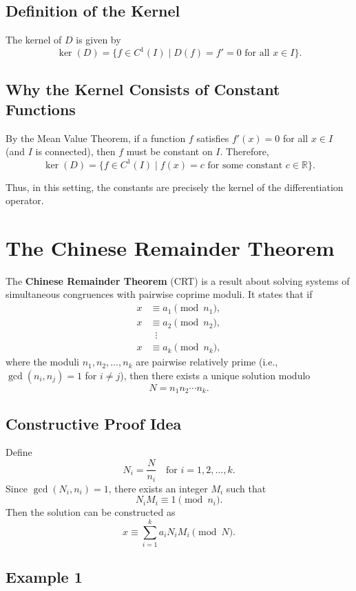 \documentclass[12pt]{article}
\theoremstyle{definition} %
\theoremstyle{plain} %
\begin{document}
\subsection*{Definition of the Kernel}
The kernel of \(D\) is given by
\[
\ker(D) = \{ f \in C^1(I) \mid D(f) = f' = 0 \text{ for all } x \in I \}.
\]

\subsection*{Why the Kernel Consists of Constant Functions}
By the Mean Value Theorem, if a function \(f\) satisfies \(f'(x) = 0\) for all \(x \in I\) (and \(I\) is connected), then \(f\) must be constant on \(I\). Therefore,
\[
\ker(D) = \{ f \in C^1(I) \mid f(x) = c \text{ for some constant } c \in \mathbb{R} \}.
\]

Thus, in this setting, the constants are precisely the kernel of the differentiation operator.

\section*{The Chinese Remainder Theorem}

The \textbf{Chinese Remainder Theorem} (CRT) is a result about solving systems of simultaneous congruences with pairwise coprime moduli. It states that if
\[
\begin{aligned}
x &\equiv a_1 \pmod{n_1}, \\
x &\equiv a_2 \pmod{n_2}, \\
&\;\;\vdots \\
x &\equiv a_k \pmod{n_k},
\end{aligned}
\]
where the moduli \(n_1, n_2, \dots, n_k\) are pairwise relatively prime (i.e., \(\gcd(n_i, n_j)=1\) for \(i\neq j\)), then there exists a unique solution modulo 
\[
N = n_1 n_2 \cdots n_k.
\]

\subsection*{Constructive Proof Idea}

Define
\[
N_i = \frac{N}{n_i} \quad \text{for } i=1,2,\dots,k.
\]
Since \(\gcd(N_i, n_i)=1\), there exists an integer \(M_i\) such that
\[
N_i M_i \equiv 1 \pmod{n_i}.
\]
Then the solution can be constructed as
\[
x \equiv \sum_{i=1}^{k} a_i N_i M_i \pmod{N}.
\]

\subsection*{Example 1}
\end{document}
